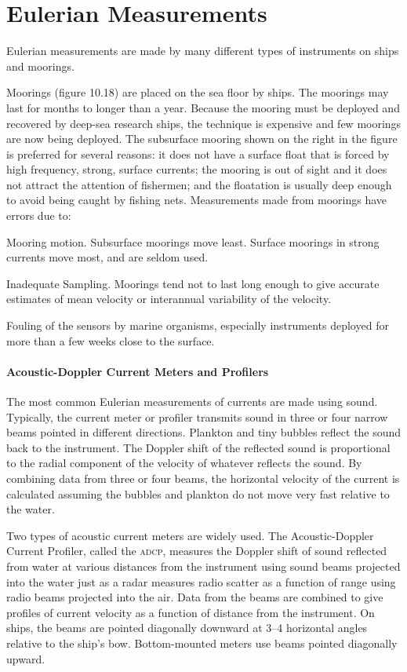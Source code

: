 \section{Eulerian Measurements}
Eulerian measurements are made by many
different types of instruments on ships and moorings.

Moorings (figure 10.18) are placed on the sea floor by ships. The
moorings may last for months to longer than a year. Because the
mooring must be deployed and recovered by deep-sea research ships, the
technique is expensive and few moorings are now being deployed. The
subsurface mooring shown on the right in the figure is preferred for
several reasons: it does not have a surface float that is forced by
high frequency, strong, surface currents; the mooring is out of sight
and it does not attract the attention of fishermen; and the floatation
is usually deep enough to avoid being caught by fishing
nets. Measurements made from moorings have errors due to:
\begin{enumerate}
\vitem Mooring motion. Subsurface moorings move least. Surface
moorings in strong currents move most, and are seldom used.

\vitem Inadequate Sampling. Moorings tend not to last long enough to
give accurate estimates of mean velocity or interannual variability of
the velocity.

\vitem Fouling of the sensors by marine organisms, especially
instruments deployed for more than a few weeks close to the surface.
\end{enumerate}

\paragraph{Acoustic-Doppler Current Meters and Profilers}
The most common
Eulerian measurements of currents are made using sound. Typically, the
current meter or profiler transmits sound in three or four narrow
beams pointed in different directions. Plankton and tiny bubbles
reflect the sound back to the instrument. The Doppler shift of the
reflected sound is proportional to the radial component of the
velocity of whatever reflects the sound. By combining data from three
or four beams, the horizontal velocity of the current is calculated
assuming the bubbles and plankton do not move very fast relative to
the water.

Two types of acoustic current meters are widely used. The
Acoustic-Doppler Current Profiler, called the \textsc{adcp}, measures
the Doppler shift of sound reflected from water at various distances
from the instrument using sound beams projected into the water just as
a radar measures radio scatter as a function of range using radio
beams projected into the air. Data from the beams are combined to give
profiles of current velocity as a function of distance from the
instrument. On ships, the beams are pointed diagonally downward at
3--4 horizontal angles relative to the ship's bow. Bottom-mounted
meters use beams pointed diagonally upward.

